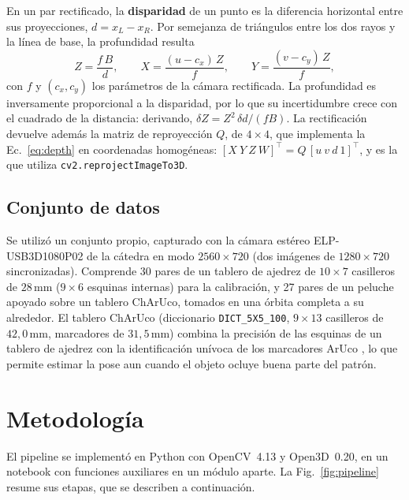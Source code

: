 \documentclass[10pt,a4paper,twocolumn]{article}
\newcommand{\mm}{\,\mathrm{mm}}
\newcommand{\T}{^{\top}}
\newcommand{\code}[1]{\texttt{#1}}
\begin{document}
En un par rectificado, la \textbf{disparidad} de un punto es la diferencia horizontal entre sus proyecciones, $d=x_L-x_R$. Por semejanza de triángulos entre los dos rayos y la línea de base, la profundidad resulta
\begin{equation}
Z=\frac{f\,B}{d},\qquad X=\frac{(u-c_x)\,Z}{f},\qquad Y=\frac{(v-c_y)\,Z}{f},
\label{eq:depth}
\end{equation}
con $f$ y $(c_x,c_y)$ los parámetros de la cámara rectificada. La profundidad es inversamente proporcional a la disparidad, por lo que su incertidumbre crece con el cuadrado de la distancia: derivando, $\delta Z = Z^2\,\delta d/(fB)$. La rectificación devuelve además la matriz de reproyección $Q$, de $4\times4$, que implementa la Ec.~\eqref{eq:depth} en coordenadas homogéneas: $[X\ Y\ Z\ W]\T=Q\,[u\ v\ d\ 1]\T$, y es la que utiliza \code{cv2.reprojectImageTo3D}.

\subsection{Conjunto de datos}
\label{sec:datos}

Se utilizó un conjunto propio, capturado con la cámara estéreo ELP-USB3D1080P02 de la cátedra en modo $2560\times720$ (dos imágenes de $1280\times720$ sincronizadas). Comprende 30 pares de un tablero de ajedrez de $10\times7$ casilleros de $28\mm$ ($9\times6$ esquinas internas) para la calibración, y 27 pares de un peluche apoyado sobre un tablero ChArUco, tomados en una órbita completa a su alrededor. El tablero ChArUco (diccionario \code{DICT\_5X5\_100}, $9\times13$ casilleros de $42{,}0\mm$, marcadores de $31{,}5\mm$) combina la precisión de las esquinas de un tablero de ajedrez con la identificación unívoca de los marcadores ArUco \cite{aruco}, lo que permite estimar la pose aun cuando el objeto ocluye buena parte del patrón.

\section{Metodología}
\label{sec:metodo}

El pipeline se implementó en Python con OpenCV~4.13 y Open3D~0.20, en un notebook con funciones auxiliares en un módulo aparte. La Fig.~\ref{fig:pipeline} resume sus etapas, que se describen a continuación.
\end{document}
